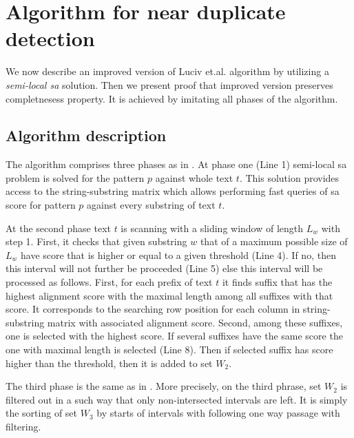 \section{Algorithm for near duplicate detection}
\label{section:luciv}

We now describe an improved version of Luciv et.al. algorithm \cite{luciv2019interactive} by utilizing a \emph{semi-local sa} solution.
Then we present proof that improved version preserves completnesess property.
It is achieved by imitating all phases of the algorithm. 
 

\subsection{Algorithm description}
The algorithm comprises three phases as in \cite{luciv2019interactive}.
At phase one (Line 1) semi-local sa problem is solved for the pattern $p$ against whole text $t$.
This solution provides access to the string-substring matrix which allows performing fast queries of sa score for pattern $p$ against every substring of text $t$.

At the second phase text $t$ is scanning with a sliding window of length $L_{w}$ with step 1.
First, it checks that given substring $w$ that of a maximum possible size of $L_{w}$ have score that is higher or equal to a given threshold (Line 4).
If no, then this interval will not further be proceeded (Line 5) else this interval will be processed as follows.
First, for each prefix of text $t$ it finds suffix that has the highest alignment score with the maximal length among all suffixes with that score. 
It corresponds to the searching row position for each column in string-substring matrix with associated alignment score. 
Second, among these suffixes, one is selected with the highest score.
If several suffixes have the same score the one with maximal length is selected (Line 8).
Then if selected suffix has score higher than the threshold, then it is added to set $W_2$.

The third phase is the same as in \cite{luciv2019interactive}. 
More precisely, on the third phrase, set $W_{2}$ is filtered out in a such way that only non-intersected intervals are left.
It is simply the sorting of set $W_{3}$ by starts of intervals with following one way passage with filtering.  


